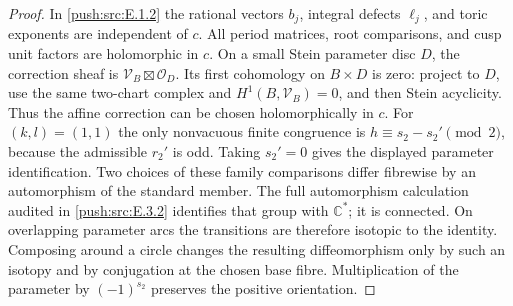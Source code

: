 \begin{proof}
In \ref{push:src:E.1.2} the rational vectors $b_j$, integral defects $\ell_j$,
and toric exponents are independent of $c$.  All period matrices,
root comparisons, and cusp unit factors are holomorphic in $c$.
On a small Stein parameter disc $D$, the correction sheaf is
$\mathcal V_B\boxtimes\mathcal O_D$.  Its first cohomology on
$B\times D$ is zero: project to $D$, use the same two-chart
complex and $H^1(B,\mathcal V_B)=0$, and then Stein acyclicity.
Thus the affine correction can be chosen holomorphically in $c$.
For $(k,l)=(1,1)$ the only nonvacuous finite congruence is
$h\equiv s_2-s_2'\pmod2$, because the admissible $r_2'$ is odd.
Taking $s_2'=0$ gives the displayed parameter identification.
Two choices of these family comparisons differ fibrewise by an
automorphism of the standard member.  The full automorphism
calculation audited in \ref{push:src:E.3.2} identifies that group with $\mathbb C^*$;
it is connected.  On overlapping parameter arcs the transitions
are therefore isotopic to the identity.  Composing around a circle
changes the resulting diffeomorphism only by such an isotopy and
by conjugation at the chosen base fibre.  Multiplication of the
parameter by $(-1)^{s_2}$ preserves the positive orientation.
\end{proof}

